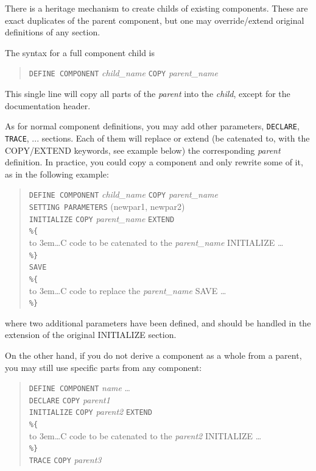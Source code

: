 There is a heritage mechanism to create childs of existing components. These are exact duplicates of the parent component, but one may override/extend original definitions of any section.

The syntax for a full component child is
\begin{quote}
  \texttt{DEFINE COMPONENT} \textit{child\_name} \texttt{COPY} \textit{parent\_name}
\end{quote}
This single line will copy all parts of the \textit{parent} into the \textit{child}, except for the documentation header.

As for normal component definitions, you may add other parameters, \texttt{DECLARE}, \texttt{TRACE}, ... sections. Each of them will replace or extend (be catenated to, with the COPY/EXTEND keywords, see example below) the corresponding \textit{parent} definition. In practice, you could copy a component and only rewrite some of it, as in the following example:
\begin{quote}
  \texttt{DEFINE COMPONENT} \textit{child\_name} \texttt{COPY} \textit{parent\_name} \\

  \texttt{SETTING PARAMETERS} (newpar1, newpar2) \\
  \texttt{INITIALIZE} \texttt{COPY} \textit{parent\_name} \texttt{EXTEND} \\
  \verb|%{|  \\
  \hbox to 3em{}\ldots C code to be catenated to the \textit{parent\_name} INITIALIZE \ldots  \\
  \verb|%}| \\
  \texttt{SAVE} \\
  \verb|%{|  \\
  \hbox to 3em{}\ldots C code to replace the \textit{parent\_name} SAVE \ldots  \\
  \verb|%}| \\
\end{quote}
where two additional parameters have been defined, and should be handled in the extension of the original INITIALIZE section.

On the other hand, if you do not derive a component as a whole from a parent, you may still use specific parts from any component:
\begin{quote}
  \texttt{DEFINE COMPONENT} \textit{name} \ldots \\
  \texttt{DECLARE} \texttt{COPY} \textit{parent1} \\
  \texttt{INITIALIZE} \texttt{COPY} \textit{parent2} \texttt{EXTEND} \\
  \verb|%{|  \\
  \hbox to 3em{}\ldots C code to be catenated to the \textit{parent2} INITIALIZE \ldots  \\
  \verb|%}| \\
  \texttt{TRACE} \texttt{COPY} \textit{parent3}
\end{quote}

